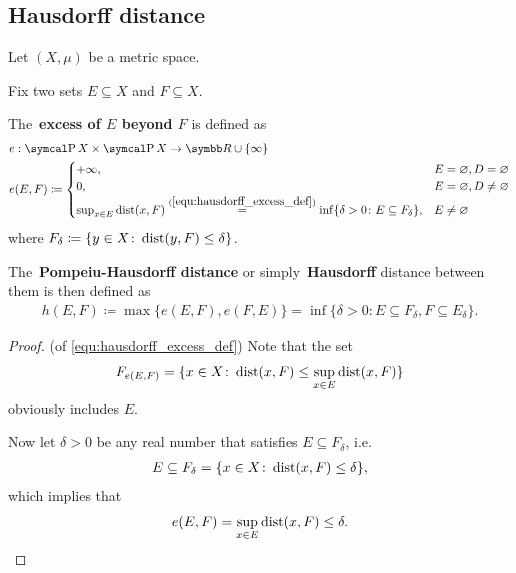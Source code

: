 \subsection{Hausdorff distance}\label{sec:hausdorff_distance}

Let \( (X, \mu) \) be a metric space.

\begin{definition}\label{def:hausdorff_distance}\cite[144]{Dontchev2014}
  Fix two sets \( E \subseteq X \) and \( F \subseteq X \).

  The~\textbf{excess of \( E \) beyond \( F \)} is defined as
  \begin{align}\label{equ:hausdorff_excess_def}
    &e: \Power X \times \Power X \to \BB{R} \cup \{ \infty \} \\ \nonumber
    &e(E, F) \coloneqq \begin{cases}
      +\infty, &E = \varnothing, D = \varnothing \\
      0, &E = \varnothing, D \neq \varnothing \\
      \sup_{x \in E} \Dist(x, F) \stackrel{(\ref{equ:hausdorff_excess_def})}{=} \inf \{\delta > 0 \colon E \subseteq F_\delta \}, &E \neq \varnothing \nonumber\refstepcounter{equation}
    \end{cases}
  \end{align}
  where \( F_\delta \coloneqq \{ y \in X \colon \operatorname{dist}(y, F) \leq \delta \} \).

  The~\textbf{Pompeiu-Hausdorff distance} or simply~\textbf{Hausdorff} distance between them is then defined as
  \begin{align*}
    h(E, F) \coloneqq \max\{ e(E, F), e(F, E) \} = \inf \{\delta > 0 \colon E \subseteq F_\delta, F \subseteq E_\delta \}.
  \end{align*}
\end{definition}
\begin{proof}(of \ref{equ:hausdorff_excess_def})
  Note that the set
  \begin{align*}
    F_{e(E, F)} = \{ x \in X \colon \operatorname{dist}(x, F) \leq \sup_{x \in E} \operatorname{dist}(x, F) \}
  \end{align*}
  obviously includes \( E \).

  Now let \( \delta > 0 \) be any real number that satisfies \( E \subseteq F_\delta \), i.e.
  \begin{align*}
    E \subseteq F_\delta = \{ x \in X \colon \operatorname{dist}(x, F) \leq \delta \},
  \end{align*}
  which implies that
  \begin{align*}
    e(E, F) = \sup_{x \in E} \operatorname{dist}(x, F) \leq \delta.
  \end{align*}
\end{proof}

